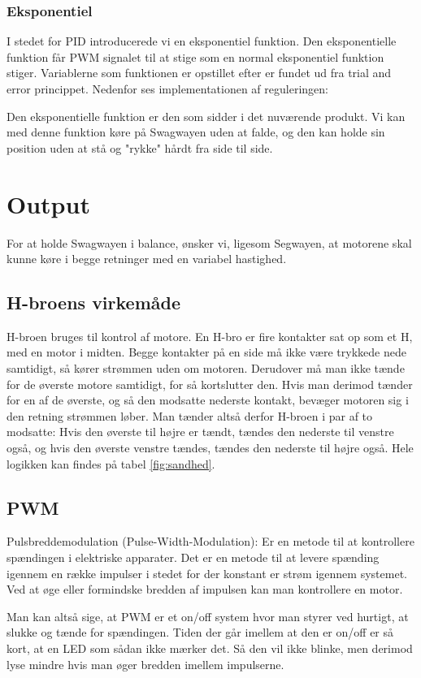 \documentclass[a4paper,oneside,article,danish,table]{memoir}
\newcommand{\swino}[2]{}
\begin{document}
\subsection{Eksponentiel}
I stedet for PID introducerede vi en eksponentiel funktion. Den eksponentielle funktion får PWM signalet til at stige som en normal eksponentiel funktion stiger. Variablerne som funktionen er opstillet efter er fundet ud fra trial and error princippet. Nedenfor ses implementationen af reguleringen:
\swino{54}{58}


Den eksponentielle funktion er den som sidder i det nuværende produkt. Vi kan med denne funktion køre på Swagwayen uden at falde, og den kan holde sin position uden at stå og "rykke" hårdt fra side til side.
\chapter{Output}
For at holde Swagwayen i balance, ønsker vi, ligesom Segwayen, at motorene skal kunne køre i begge retninger med en variabel hastighed.
\section{H-broens virkemåde} 
\label{sec:H-broen}
H-broen bruges til kontrol af motore. 
En H-bro er fire kontakter sat op som et H, med en motor i midten. Begge kontakter på en side må ikke være trykkede nede samtidigt, så kører strømmen uden om motoren. Derudover må man ikke tænde for de øverste motore samtidigt, for så kortslutter den. Hvis man derimod tænder for en af de øverste, og så den modsatte nederste kontakt, bevæger motoren sig i den retning strømmen løber. Man tænder altså derfor H-broen i par af to modsatte: Hvis den øverste til højre er tændt, tændes den nederste til venstre også, og hvis den øverste venstre tændes, tændes den nederste til højre også. Hele logikken kan findes på tabel \ref{fig:sandhed}. 
\section{PWM}
Pulsbreddemodulation (Pulse-Width-Modulation): Er en metode til at kontrollere spændingen i elektriske
apparater. Det er en metode til at levere spænding igennem en række impulser i stedet for der konstant er strøm igennem systemet. Ved at øge eller formindske bredden af impulsen kan man kontrollere en motor.

Man kan altså sige, at PWM er et on/off system hvor man styrer ved hurtigt, at slukke og tænde for
spændingen. Tiden der går imellem at den er on/off er så kort, at en LED som sådan ikke mærker det. Så
den vil ikke blinke, men derimod lyse mindre hvis man øger bredden imellem impulserne.
\end{document}
